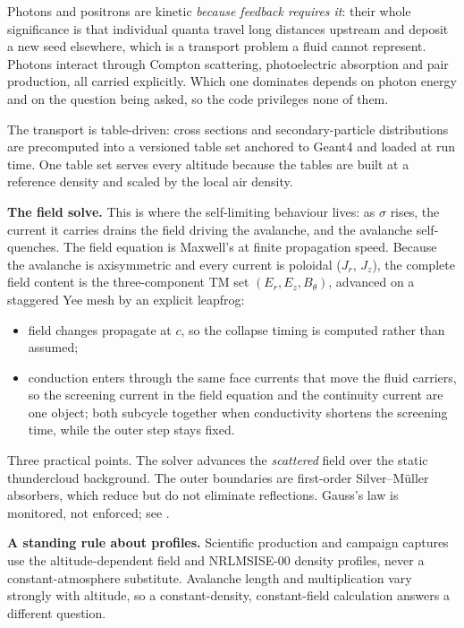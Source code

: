 \documentclass[11pt]{article}
\begin{document}
Photons and positrons are kinetic \emph{because feedback requires it}: their
whole significance is that individual quanta travel long distances upstream and
deposit a new seed elsewhere, which is a transport problem a fluid cannot
represent. Photons interact through Compton scattering, photoelectric absorption
and pair production, all carried explicitly. Which one dominates depends on
photon energy and on the question being asked, so the code privileges none of
them.

The transport is table-driven: cross sections and secondary-particle
distributions are precomputed into a versioned table set anchored to Geant4 and
loaded at run time. One table set serves every altitude because the tables are
built at a reference density and scaled by the local air density.

\textbf{The field solve.} This is where the self-limiting behaviour lives: as
$\sigma$ rises, the current it carries drains the field driving the avalanche,
and the avalanche self-quenches. The field equation is Maxwell's at finite
propagation speed. Because the
avalanche is axisymmetric and every current is poloidal ($J_r$, $J_z$), the
complete field content is the three-component TM set $(E_r, E_z, B_\theta)$,
advanced on a staggered Yee mesh by an explicit leapfrog:
\begin{itemize}
  \item field changes propagate at $c$, so the collapse timing is computed
        rather than assumed;
  \item conduction enters through the same face currents that move the fluid
        carriers, so the screening current in the field equation and the
        continuity current are one object; both subcycle together when
        conductivity shortens the screening time, while the outer step stays fixed.
\end{itemize}
Three practical points. The solver advances the \emph{scattered} field over
the static thundercloud background. The outer boundaries are
first-order Silver--M\"uller absorbers, which reduce but do not eliminate
reflections. Gauss's law is monitored, not enforced; see
.

\textbf{A standing rule about profiles.} Scientific production and campaign
captures use the altitude-dependent field and NRLMSISE-00 density profiles,
never a constant-atmosphere substitute.
Avalanche length and multiplication vary strongly with altitude, so a
constant-density, constant-field calculation answers a different question.
\end{document}
